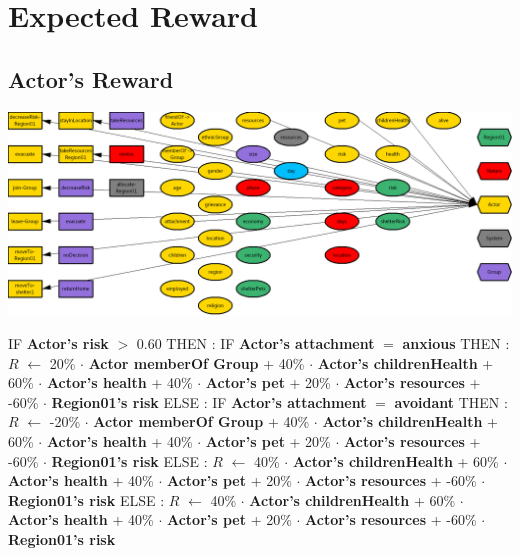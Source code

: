 \documentclass{article}%
\begin{document}
%
\section{Expected Reward}%
\label{sec:Expected Reward}%
\subsection{Actor's Reward}%
\label{subsec:Actor's Reward}%
\includegraphics[width=\textwidth]{images/Actor.png}%
\begin{flushleft}%
IF %
\textbf{Actor's risk}%
$>$%
0.60%
\linebreak%
\hspace*{2em}%
THEN %
: %
IF %
\textbf{Actor's attachment}%
$=$%
\textbf{anxious}%
\linebreak%
\hspace*{4em}%
THEN %
: %
$R$%
$\leftarrow$%
20\%%
$\cdot$%
\textbf{Actor memberOf Group}%
+%
40\%%
$\cdot$%
\textbf{Actor's childrenHealth}%
+%
60\%%
$\cdot$%
\textbf{Actor's health}%
+%
40\%%
$\cdot$%
\textbf{Actor's pet}%
+%
20\%%
$\cdot$%
\textbf{Actor's resources}%
+%
{-}60\%%
$\cdot$%
\textbf{Region01's risk}%
\linebreak%
\hspace*{4em}%
ELSE %
: %
IF %
\textbf{Actor's attachment}%
$=$%
\textbf{avoidant}%
\linebreak%
\hspace*{6em}%
THEN %
: %
$R$%
$\leftarrow$%
{-}20\%%
$\cdot$%
\textbf{Actor memberOf Group}%
+%
40\%%
$\cdot$%
\textbf{Actor's childrenHealth}%
+%
60\%%
$\cdot$%
\textbf{Actor's health}%
+%
40\%%
$\cdot$%
\textbf{Actor's pet}%
+%
20\%%
$\cdot$%
\textbf{Actor's resources}%
+%
{-}60\%%
$\cdot$%
\textbf{Region01's risk}%
\linebreak%
\hspace*{6em}%
ELSE %
: %
$R$%
$\leftarrow$%
40\%%
$\cdot$%
\textbf{Actor's childrenHealth}%
+%
60\%%
$\cdot$%
\textbf{Actor's health}%
+%
40\%%
$\cdot$%
\textbf{Actor's pet}%
+%
20\%%
$\cdot$%
\textbf{Actor's resources}%
+%
{-}60\%%
$\cdot$%
\textbf{Region01's risk}%
\linebreak%
\hspace*{2em}%
ELSE %
: %
$R$%
$\leftarrow$%
40\%%
$\cdot$%
\textbf{Actor's childrenHealth}%
+%
60\%%
$\cdot$%
\textbf{Actor's health}%
+%
40\%%
$\cdot$%
\textbf{Actor's pet}%
+%
20\%%
$\cdot$%
\textbf{Actor's resources}%
+%
{-}60\%%
$\cdot$%
\textbf{Region01's risk}%
\end{flushleft}
\end{document}
